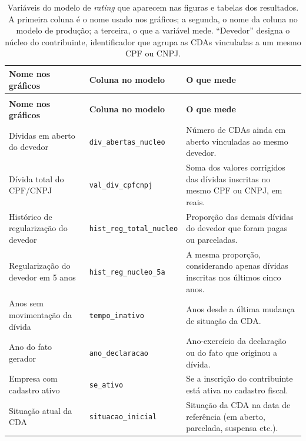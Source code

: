 {\renewcommand{\arraystretch}{1.2}
\setlength{\LTcapwidth}{\textwidth}
\begin{longtable}{>{\small\raggedright\arraybackslash}p{3.7cm}>{\small\raggedright\arraybackslash}p{4.4cm}>{\small\raggedright\arraybackslash}p{\dimexpr\textwidth-8.1cm-6\tabcolsep\relax}}
    \caption[Variáveis do modelo citadas nos resultados]{Variáveis do modelo de \textit{rating} que aparecem nas figuras e tabelas dos resultados. A primeira coluna é o nome usado nos gráficos; a segunda, o nome da coluna no modelo de produção; a terceira, o que a variável mede. ``Devedor'' designa o núcleo do contribuinte, identificador que agrupa as CDAs vinculadas a um mesmo CPF ou CNPJ.}
    \label{tab:glossario_variaveis} \\
    \toprule
    \textbf{Nome nos gráficos} & \textbf{Coluna no modelo} & \textbf{O que mede} \\
    \midrule
    \endfirsthead
    \multicolumn{3}{l}{\small\textit{(continuação)}} \\
    \toprule
    \textbf{Nome nos gráficos} & \textbf{Coluna no modelo} & \textbf{O que mede} \\
    \midrule
    \endhead
    \bottomrule
    \endlastfoot
        Dívidas em aberto do devedor & \texttt{div\_abertas\_nucleo} & Número de CDAs ainda em aberto vinculadas ao mesmo devedor. \\
        Dívida total do CPF/CNPJ & \texttt{val\_div\_cpfcnpj} & Soma dos valores corrigidos das dívidas inscritas no mesmo CPF ou CNPJ, em reais. \\
        Histórico de regularização do devedor & \texttt{hist\_reg\_total\_nucleo} & Proporção das demais dívidas do devedor que foram pagas ou parceladas. \\
        Regularização do devedor em 5 anos & \texttt{hist\_reg\_nucleo\_5a} & A mesma proporção, considerando apenas dívidas inscritas nos últimos cinco anos. \\
        Anos sem movimentação da dívida & \texttt{tempo\_inativo} & Anos desde a última mudança de situação da CDA. \\
        Ano do fato gerador & \texttt{ano\_declaracao} & Ano-exercício da declaração ou do fato que originou a dívida. \\
        Empresa com cadastro ativo & \texttt{se\_ativo} & Se a inscrição do contribuinte está ativa no cadastro fiscal. \\
        Situação atual da CDA & \texttt{situacao\_inicial} & Situação da CDA na data de referência (em aberto, parcelada, suspensa etc.). \\

\end{longtable}}
